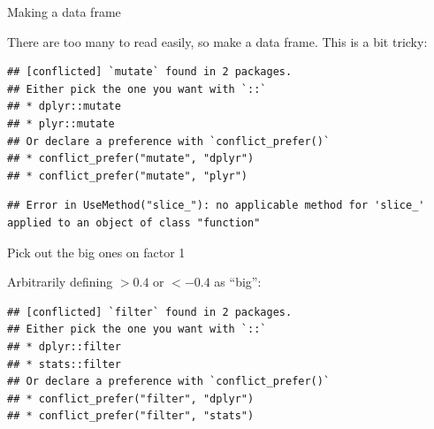 \documentclass[ignorenonframetext,]{beamer}
\newenvironment{Shaded}{\begin{snugshade}}{\end{snugshade}}
\newcommand{\DataTypeTok}[1]{\textcolor[rgb]{0.13,0.29,0.53}{#1}}
\newcommand{\DecValTok}[1]{\textcolor[rgb]{0.00,0.00,0.81}{#1}}
\newcommand{\FloatTok}[1]{\textcolor[rgb]{0.00,0.00,0.81}{#1}}
\newcommand{\KeywordTok}[1]{\textcolor[rgb]{0.13,0.29,0.53}{\textbf{#1}}}
\newcommand{\NormalTok}[1]{#1}
\newcommand{\OperatorTok}[1]{\textcolor[rgb]{0.81,0.36,0.00}{\textbf{#1}}}
\newcommand{\StringTok}[1]{\textcolor[rgb]{0.31,0.60,0.02}{#1}}
\begin{document}
\begin{frame}[fragile]{Making a data frame}
\protect\hypertarget{making-a-data-frame}{}

There are too many to read easily, so make a data frame. This is a bit
tricky:

\begin{Shaded}
\end{Shaded}

\begin{verbatim}
## [conflicted] `mutate` found in 2 packages.
## Either pick the one you want with `::` 
## * dplyr::mutate
## * plyr::mutate
## Or declare a preference with `conflict_prefer()`
## * conflict_prefer("mutate", "dplyr")
## * conflict_prefer("mutate", "plyr")
\end{verbatim}

\begin{Shaded}
\end{Shaded}

\begin{verbatim}
## Error in UseMethod("slice_"): no applicable method for 'slice_' applied to an object of class "function"
\end{verbatim}

\end{frame}

\begin{frame}[fragile]{Pick out the big ones on factor 1}
\protect\hypertarget{pick-out-the-big-ones-on-factor-1}{}

Arbitrarily defining \(>0.4\) or \(<-0.4\) as ``big'':

\begin{Shaded}
\end{Shaded}

\begin{verbatim}
## [conflicted] `filter` found in 2 packages.
## Either pick the one you want with `::` 
## * dplyr::filter
## * stats::filter
## Or declare a preference with `conflict_prefer()`
## * conflict_prefer("filter", "dplyr")
## * conflict_prefer("filter", "stats")
\end{verbatim}

\end{frame}
\end{document}
